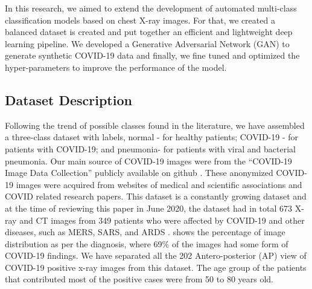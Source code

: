 In this research, we aimed to extend the development of automated multi-class classification models based on chest X-ray images. For that, we created a balanced dataset is created and  put together an efficient and lightweight deep learning pipeline.
We developed a Generative Adversarial Network (GAN) to generate synthetic COVID-19 data and finally, we fine tuned and optimized the hyper-parameters to improve the performance of the model. 



\subsection{Dataset Description}

Following the trend of possible classes found in the literature, we have assembled a three-class dataset with labels,  normal - for healthy patients;  COVID-19 - for patients with COVID-19; and pneumonia- for patients with viral and bacterial pneumonia. Our main source of COVID-19 images were from the “COVID-19 Image Data Collection”  publicly available on github \cite{cohen2020covid}. These anonymized COVID-19 images were acquired from websites of medical and scientific associations and COVID related research papers. This dataset is a constantly growing dataset and at the time of reviewing this paper in June 2020, the dataset had in total 673 X-ray and CT images from 349 patients who were affected by COVID-19 and other diseases, such as MERS, SARS, and ARDS \cite{araujo2020covid}.  shows the percentage of image distribution as per the diagnosis, where 69\% of the images had some form of COVID-19 findings. We have separated all the 202 Antero-posterior (AP) view of COVID-19 positive x-ray images from this dataset. The age group of the patients that contributed most of the positive cases were from 50 to 80 years old.





